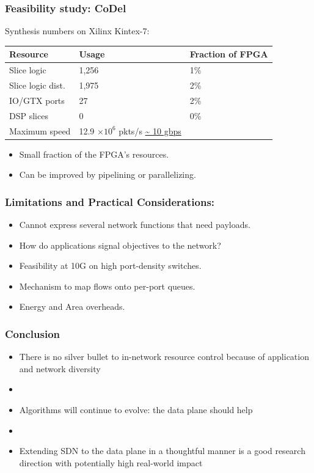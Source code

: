 \begin{frame}[plain]
\frametitle{Feasibility study: CoDel}
\begin{center}
Synthesis numbers on Xilinx Kintex-7: \\
\begin{tabular}{lll}
\bf Resource & \bf Usage & \bf Fraction of FPGA \\
\hline Slice logic & 1,256 & 1\% \\
Slice logic dist. & 1,975 & 2\% \\
IO/GTX ports & 27 & 2\% \\
DSP slices & 0 & 0\% \\
Maximum speed & 12.9 $\times 10^6$ pkts/s \url{~ 10 gbps} \\
\end{tabular}
\end{center}
\begin{itemize}
\item Small fraction of the FPGA's resources.
\item Can be improved by pipelining or parallelizing.
\end{itemize}
\end{frame}

\begin{frame}[plain]
\frametitle{Limitations and Practical Considerations:}
\begin{itemize}
\item Cannot express several network functions that need payloads.
\item How do applications signal objectives to the network?
\item Feasibility at 10G on high port-density  switches.
\item Mechanism to map flows onto per-port queues.
\item Energy and Area overheads.
\end{itemize}
\end{frame}

\begin{frame}[plain]

\frametitle{Conclusion}
\begin{itemize}

\item There is no silver bullet to in-network resource control because
  of application and network diversity

\item[]
\item Algorithms will continue to evolve: the data plane should help

\item[]
\item Extending SDN to the data plane in a thoughtful manner is a good
  research direction with potentially high real-world impact

\end{itemize}
\end{frame}
